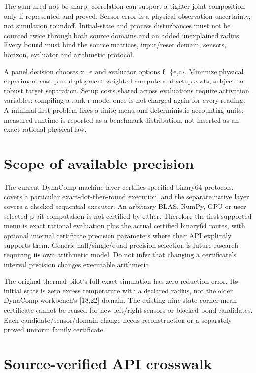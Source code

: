 \documentclass[
  11pt,
  a4paper,
]{report}
\let\nxtexttt\texttt
\renewcommand{\texttt}[1]{\nxtexttt{\seqsplit{#1}}}
\begin{document}
The sum need not be sharp; correlation can support a tighter joint
composition only if represented and proved. Sensor error is a physical
observation uncertainty, not simulation roundoff. Initial-state and
process disturbances must not be counted twice through both source
domains and an added unexplained radius. Every bound must bind the
source matrices, input/reset domain, sensors, horizon, evaluator and
arithmetic protocol.

A panel decision chooses x\_e and evaluator options f\_\{e,c\}. Minimize
physical experiment cost plus deployment-weighted compute and setup
costs, subject to robust target separation. Setup costs shared across
evaluations require activation variables: compiling a rank-r model once
is not charged again for every reading. A minimal first problem fixes a
finite menu and deterministic accounting units; measured runtime is
reported as a benchmark distribution, not inserted as an exact rational
physical law.

\hypertarget{scope-of-available-precision}{%
\section{Scope of available
precision}\label{scope-of-available-precision}}

The current DynaComp machine layer certifies specified binary64
protocols. \texttt{certify\_execution} covers a particular
exact-dot-then-round execution, and the separate native layer covers a
checked sequential executor. An arbitrary BLAS, NumPy, GPU or
user-selected p-bit computation is not certified by either. Therefore
the first supported menu is exact rational evaluation plus the actual
certified binary64 routes, with optional internal certificate precision
parameters where their API explicitly supports them. Generic
half/single/quad precision selection is future research requiring its
own arithmetic model. Do not infer that changing a certificate's
interval precision changes executable arithmetic.

The original thermal pilot's full exact simulation has zero reduction
error. Its initial state is zero excess temperature with a declared
radius, not the older DynaComp workbench's {[}18,22{]} domain. The
existing nine-state corner-mean certificate cannot be reused for new
left/right sensors or blocked-bond candidates. Each
candidate/sensor/domain change needs reconstruction or a separately
proved uniform family certificate.

\hypertarget{source-verified-api-crosswalk}{%
\section{Source-verified API
crosswalk}\label{source-verified-api-crosswalk}}
\end{document}
